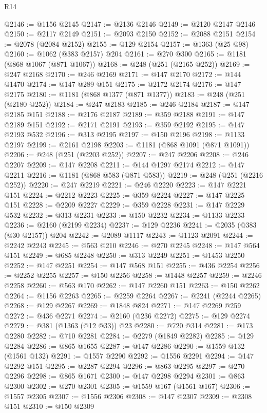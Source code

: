 \begin{lexlean}{R14}
\begin{coremodule}
@2146 := @1156 @2145
@2147 := @2136 @2146
@2149 := @2120 @2147 @2146
@2150 := @2117 @2149
@2151 := @2093 @2150
@2152 := @2088 @2151
@2154 := @2078 (@2084 @2152)
@2155 := @129 @2154
@2157 := @1363 (@25 @98)
@2160 := @1062 (@383 @2157) @204
@2161 := @270 @300
@2165 := @1181 (@868 @1067 (@871 @1067))
@2168 := @248 (@251 (@2165 @252))
@2169 := @247 @2168
@2170 := @246 @2169
@2171 := @147 @2170
@2172 := @144 @1470
@2174 := @147 @289 @151
@2175 := @2172 @2174
@2176 := @147 @2175
@2180 := @1181 (@868 @1377 (@871 @1377))
@2183 := @248 (@251 (@2180 @252))
@2184 := @247 @2183
@2185 := @246 @2184
@2187 := @147 @2185 @151
@2188 := @2176 @2187
@2189 := @359 @2188
@2191 := @147 @2189 @151
@2192 := @2171 @2191
@2193 := @359 @2192
@2195 := @147 @2193 @532
@2196 := @313 @2195
@2197 := @150 @2196
@2198 := @1133 @2197
@2199 := @2161 @2198
@2203 := @1181 (@868 @1091 (@871 @1091))
@2206 := @248 (@251 (@2203 @252))
@2207 := @247 @2206
@2208 := @246 @2207
@2209 := @147 @2208
@2211 := @144 @1297 @2174
@2212 := @147 @2211
@2216 := @1181 (@868 @583 (@871 @583))
@2219 := @248 (@251 (@2216 @252))
@2220 := @247 @2219
@2221 := @246 @2220
@2223 := @147 @2221 @151
@2224 := @2212 @2223
@2225 := @359 @2224
@2227 := @147 @2225 @151
@2228 := @2209 @2227
@2229 := @359 @2228
@2231 := @147 @2229 @532
@2232 := @313 @2231
@2233 := @150 @2232
@2234 := @1133 @2233
@2236 := @2160 (@2199 @2234)
@2237 := @129 @2236
@2241 := @2035 (@383 (@30 @2157)) @204
@2242 := @2089 @1117
@2243 := @1123 @2091
@2244 := @2242 @2243
@2245 := @563 @210
@2246 := @270 @2245
@2248 := @147 @564 @151
@2249 := @685 @2248
@2250 := @313 @2249
@2251 := @1453 @2250
@2252 := @147 @2251
@2254 := @147 @568 @151
@2255 := @436 @2254
@2256 := @2252 @2255
@2257 := @150 @2256
@2258 := @1448 @2257
@2259 := @2246 @2258
@2260 := @563 @170
@2262 := @147 @2260 @151
@2263 := @150 @2262
@2264 := @1156 @2263
@2265 := @2259 @2264
@2267 := @2241 (@2244 @2265)
@2268 := @129 @2267
@2269 := @1848 @824
@2271 := @147 @2269 @259
@2272 := @436 @2271
@2274 := @2160 (@236 @2272)
@2275 := @129 @2274
@2279 := @381 (@1363 (@12 @33)) @23
@2280 := @720 @314
@2281 := @173 @2280
@2282 := @710 @2281
@2284 := @2279 (@1849 @2282)
@2285 := @129 @2284
@2286 := @865 @1655
@2287 := @147 @2286
@2290 := @1559 @132 (@1561 @132)
@2291 := @1557 @2290
@2292 := @1556 @2291
@2294 := @147 @2292 @151
@2295 := @2287 @2294
@2296 := @863 @2295
@2297 := @270 @2296
@2298 := @865 @1671
@2300 := @147 @2298 @2294
@2301 := @863 @2300
@2302 := @270 @2301
@2305 := @1559 @167 (@1561 @167)
@2306 := @1557 @2305
@2307 := @1556 @2306
@2308 := @147 @2307
@2309 := @2308 @151
@2310 := @150 @2309

\end{coremodule}
\end{lexlean}
